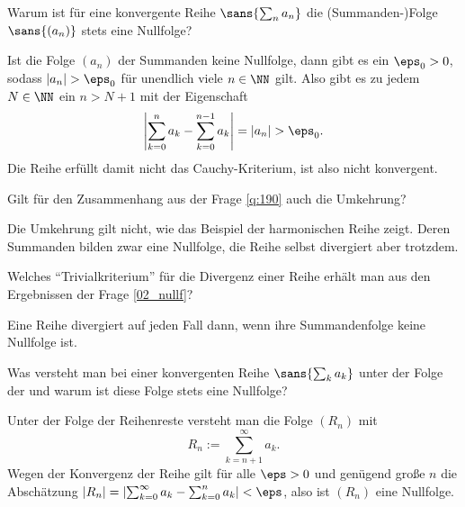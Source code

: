 \begin{frage}\label{02_nullf}
  Warum ist für eine konvergente Reihe $\sans{\sum_n a_n}$ die 
  (Summanden-)Folge $\sans{(a_n)}$ stets eine Nullfolge? 
\end{frage}

\begin{antwort}
  \label{q:190}
  Ist die Folge $(a_n)$ der Summanden keine Nullfolge, 
  dann gibt es ein $\eps_0>0$, sodass $|a_n|>\eps_0$ für unendlich viele 
  $n\in \NN$ gilt. Also gibt es zu jedem $N\in\NN$ ein $n>N+1$ mit der 
  Eigenschaft
  \[
  \left| \sum_{k=0}^n a_k -\sum_{k=0}^{n-1} a_k \right| = |a_n| > \eps_0. 
  \]
  Die Reihe erfüllt damit nicht das Cauchy-Kriterium, ist also nicht 
  konvergent.
  \AntEnd    
\end{antwort}

\begin{frage}
  Gilt für den Zusammenhang aus der Frage \ref{q:190} auch die Umkehrung?
\end{frage}

\begin{antwort}
  Die Umkehrung gilt nicht, wie das Beispiel der harmonischen 
  Reihe zeigt. Deren Summanden bilden zwar eine Nullfolge, die Reihe 
  selbst divergiert aber trotzdem.
  \AntEnd
\end{antwort}

\begin{frage}\label{02_trivial}
  Welches "`Trivialkriterium"' für die Divergenz einer Reihe erhält man aus 
  den Ergebnissen der Frage \ref{02_nullf}?
\end{frage}

\begin{antwort}
  Eine Reihe divergiert auf jeden Fall dann, wenn ihre Summandenfolge 
  keine Nullfolge ist.
  \AntEnd
\end{antwort}

\begin{frage}\label{02_reste}
  Was versteht man bei einer konvergenten Reihe $\sans{\sum_k a_k}$ 
  unter der Folge der  und warum ist diese Folge stets 
  eine Nullfolge?
\end{frage}

\begin{antwort}
  Unter der Folge der Reihenreste versteht man die Folge $(R_n)$ mit 
  \[
  R_n := \sum_{k=n+1}^{\infty} a_k.
  \]
  Wegen der Konvergenz der Reihe gilt für alle $\eps>0$ und genügend große 
  $n$ die Abschätzung $
  |R_n| =  \left |\sum_{k=0}^\infty a_k-\sum_{k=0}^{n} a_k \right| < \eps$, 
  also ist $(R_n)$ eine Nullfolge.
  \AntEnd
\end{antwort}

